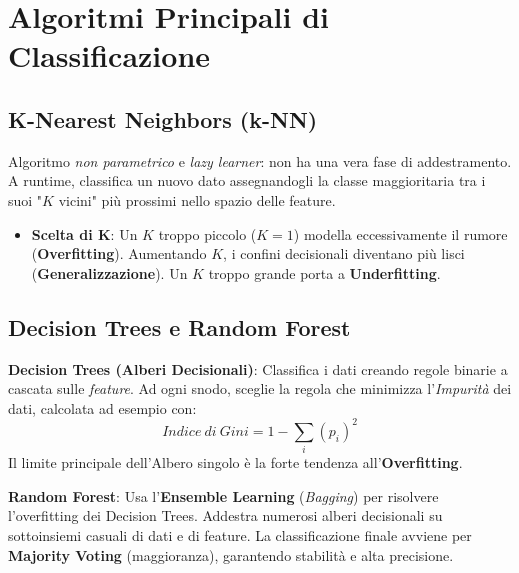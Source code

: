 \section{Algoritmi Principali di Classificazione}

\subsection{K-Nearest Neighbors (k-NN)}
Algoritmo \textit{non parametrico} e \textit{lazy learner}: non ha una vera fase di addestramento.
A runtime, classifica un nuovo dato assegnandogli la classe maggioritaria tra i suoi "$K$ vicini" più prossimi nello spazio delle feature.
\begin{itemize}
    \item \textbf{Scelta di K}: Un $K$ troppo piccolo ($K=1$) modella eccessivamente il rumore (\textbf{Overfitting}). Aumentando $K$, i confini decisionali diventano più lisci (\textbf{Generalizzazione}). Un $K$ troppo grande porta a \textbf{Underfitting}.
\end{itemize}

\subsection{Decision Trees e Random Forest}
\textbf{Decision Trees (Alberi Decisionali)}: Classifica i dati creando regole binarie a cascata sulle \textit{feature}.
Ad ogni snodo, sceglie la regola che minimizza l'\textit{Impurità} dei dati, calcolata ad esempio con:
\begin{equation}
    Indice\ di\ Gini = 1 - \sum_{i} (p_i)^2
\end{equation}
Il limite principale dell'Albero singolo è la forte tendenza all'\textbf{Overfitting}.

\textbf{Random Forest}: Usa l'\textbf{Ensemble Learning} (\textit{Bagging}) per risolvere l'overfitting dei Decision Trees.
Addestra numerosi alberi decisionali su sottoinsiemi casuali di dati e di feature.
La classificazione finale avviene per \textbf{Majority Voting} (maggioranza), garantendo stabilità e alta precisione.

